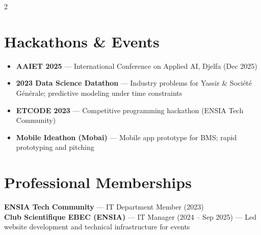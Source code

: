 \documentclass[8pt, letterpaper]{extarticle}
\begin{document}
\begin{multicols}{2}
\section*{{\color{accent}}\; Hackathons \& Events}
\begin{itemize}[leftmargin=*]
    \item \textbf{AAIET 2025} — International Conference on Applied AI, Djelfa (Dec 2025)
    \item \textbf{2023 Data Science Datathon} — Industry problems for Yassir \& Société Générale; predictive modeling under time constraints
    \item \textbf{ETCODE 2023} — Competitive programming hackathon (ENSIA Tech Community)
    \item \textbf{Mobile Ideathon (Mobai)} — Mobile app prototype for BMS; rapid prototyping and pitching
\end{itemize}

\section*{{\color{accent}}\; Professional Memberships}
\textbf{ENSIA Tech Community} — IT Department Member (2023) \\
\textbf{Club Scientifique EBEC (ENSIA)} — IT Manager (2024 – Sep 2025) — Led website development and technical infrastructure for events

\end{multicols}
\end{document}

